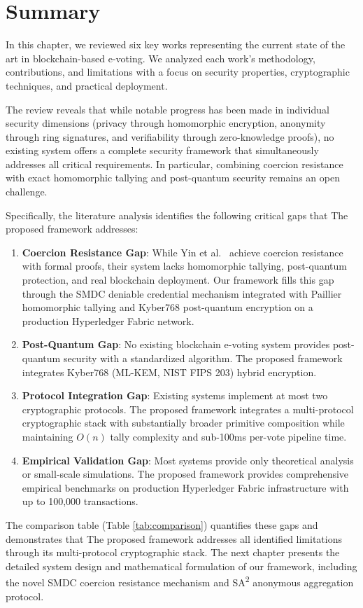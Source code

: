 \section{Summary}
\label{sec:lit-summary}

In this chapter, we reviewed six key works representing the current state of the art in blockchain-based e-voting. We analyzed each work's methodology, contributions, and limitations with a focus on security properties, cryptographic techniques, and practical deployment.

The review reveals that while notable progress has been made in individual security dimensions (privacy through homomorphic encryption, anonymity through ring signatures, and verifiability through zero-knowledge proofs), no existing system offers a complete security framework that simultaneously addresses all critical requirements. In particular, combining coercion resistance with exact homomorphic tallying and post-quantum security remains an open challenge.

Specifically, the literature analysis identifies the following critical gaps that The proposed framework addresses:

\begin{enumerate}
    \item \textbf{Coercion Resistance Gap}: While Yin et al.~\cite{yin_tdsc} achieve coercion resistance with formal proofs, their system lacks homomorphic tallying, post-quantum protection, and real blockchain deployment. Our framework fills this gap through the SMDC deniable credential mechanism integrated with Paillier homomorphic tallying and Kyber768 post-quantum encryption on a production Hyperledger Fabric network.
    
    \item \textbf{Post-Quantum Gap}: No existing blockchain e-voting system provides post-quantum security with a standardized algorithm. The proposed framework integrates Kyber768 (ML-KEM, NIST FIPS 203) hybrid encryption.
    
    \item \textbf{Protocol Integration Gap}: Existing systems implement at most two cryptographic protocols. The proposed framework integrates a multi-protocol cryptographic stack with substantially broader primitive composition while maintaining $O(n)$ tally complexity and sub-100ms per-vote pipeline time.
    
    \item \textbf{Empirical Validation Gap}: Most systems provide only theoretical analysis or small-scale simulations. The proposed framework provides comprehensive empirical benchmarks on production Hyperledger Fabric infrastructure with up to 100,000 transactions.
\end{enumerate}

The comparison table (Table \ref{tab:comparison}) quantifies these gaps and demonstrates that The proposed framework addresses all identified limitations through its multi-protocol cryptographic stack. The next chapter presents the detailed system design and mathematical formulation of our framework, including the novel SMDC coercion resistance mechanism and SA\textsuperscript{2} anonymous aggregation protocol.
